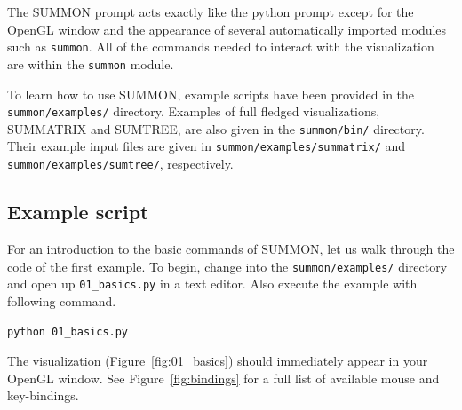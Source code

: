 \documentclass[12pt]{article}
\newcommand{\code}[1]{{\tt #1}}
\newcommand{\codeblock}[1]{\vspace{.1in} {\tt #1} \vspace{.1in}}
\newcommand{\figref}[1]{Figure~\ref{#1}}
\begin{document}
The SUMMON prompt acts exactly like the python prompt except for the OpenGL
window and the appearance of several automatically imported modules such as 
\code{summon}.  All of the commands needed to interact with the visualization
are within the \code{summon}  module.  

To learn how to use SUMMON, example scripts have been provided in the 
\code{summon/examples/} directory.  Examples of full fledged visualizations,
SUMMATRIX and SUMTREE, are also given in the \code{summon/bin/} directory. 
Their example input files are given in \code{summon/examples/summatrix/} and
\code{summon/examples/sumtree/}, respectively.



\subsection{Example script}

For an introduction to the basic commands of SUMMON, let us walk through the
code of the first example.  To begin, change into the
\code{summon/examples/} directory and open up \code{01\_basics.py} in a
text editor.  Also execute the example with following command.

\codeblock{python 01\_basics.py}

The visualization (\figref{fig:01_basics}) should immediately appear in your
OpenGL window.  See \figref{fig:bindings} for a full list of available 
mouse and key-bindings.
\end{document}
